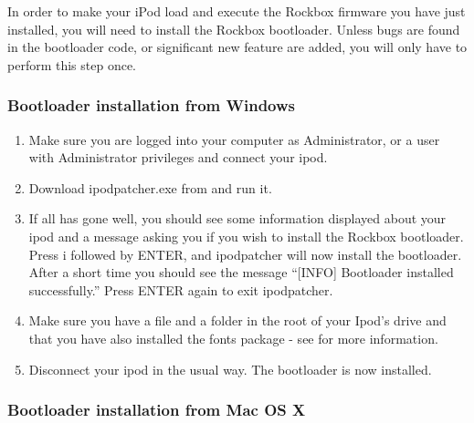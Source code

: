 

In order to make your iPod load and execute the Rockbox firmware you
have just installed, you will need to install the Rockbox
bootloader. Unless bugs are found in the bootloader code, or
significant new feature are added, you will only have to perform this
step once.

\subsubsection{Bootloader installation from Windows}

\begin{enumerate}

\item Make sure you are logged into your computer as Administrator, or a 
user with Administrator privileges and connect your ipod.

\item Download ipodpatcher.exe from 
and run it.

\item If all has gone well, you should see some information displayed about
your ipod and a message asking you if you wish to install the Rockbox
bootloader. Press i followed by ENTER, and ipodpatcher will now
install the bootloader. After a short time you should see the message
``[INFO] Bootloader installed successfully.'' Press ENTER again to exit
ipodpatcher.

\item Make sure you have a  file and a 
 folder in the 
root of your Ipod's drive and that you have also installed the fonts
package - see  for more information.

\item Disconnect your ipod in the usual way. The bootloader is now installed. 

\end{enumerate}

\subsubsection{Bootloader installation from Mac OS X}

